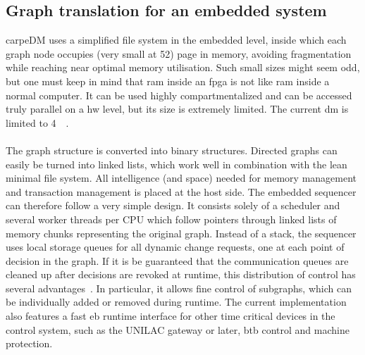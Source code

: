 \subsection{Graph translation for an embedded system}
carpeDM uses a simplified file system in the embedded level, inside which each graph node occupies (very small at \SI{52}{\byte}) page in memory, avoiding fragmentation while reaching near optimal memory utilisation. 
Such small sizes might seem odd, but one must keep in mind that \gls{ram} inside an \gls{fpga} is not like \gls{ram} inside a normal computer. It can be used highly compartmentalized and can be accessed truly parallel on a \gls{hw} level, but its size is extremely limited. The current \gls{dm} is limited to \SI{4}{\mega\byte}.
\paragraph{}
The graph structure is converted into binary structures. Directed graphs can easily be turned into linked lists, which work well in combination with the lean minimal file system.
All intelligence (and space) needed for memory management and transaction management is placed at the host side. The embedded sequencer can therefore follow a very simple design. It consists solely of a scheduler and several worker threads per CPU which follow pointers through linked lists of memory chunks representing the original graph.
Instead of a stack, the sequencer uses local storage queues for all dynamic change requests, one at each point of decision in the graph.
If it is be guaranteed that the communication queues are cleaned up after decisions are revoked at runtime, this distribution of control has several advantages~\cite[]{}. In particular, it allows fine control of subgraphs, which can be individually added or removed during runtime.
The current implementation also features a fast \gls{eb} runtime interface for other time critical devices in the control system, such as the UNILAC gateway or later, \gls{btb} control and machine protection.



